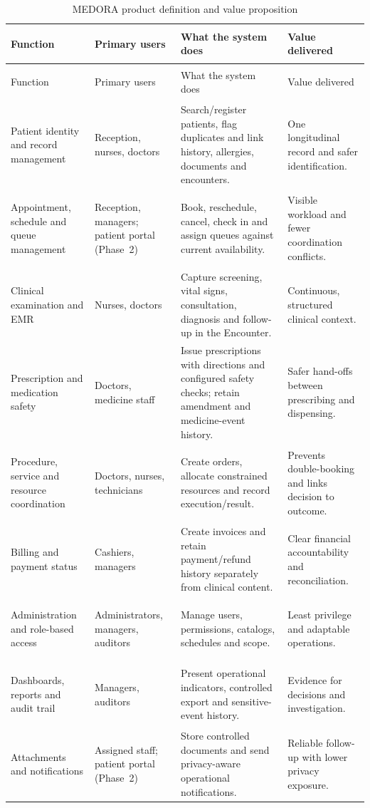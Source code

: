 \documentclass[a4paper,12pt]{article}
\begin{document}
\begingroup
    \renewcommand{\arraystretch}{1.25}
    \small
    \setlength{\LTleft}{0pt}
    \setlength{\LTright}{0pt}
\begin{longtable}{@{}>{\bfseries\raggedright\arraybackslash}p{}p{}p{}p{}@{}}
    \caption{MEDORA product definition and value proposition}\label{tab:product-definition}\\
        \toprule
        Function & Primary users & What the system does & Value delivered \\
        \midrule
    \endfirsthead
    \toprule
    Function & Primary users & What the system does & Value delivered \\
    \midrule
    \endhead
        Patient identity and record management & Reception, nurses, doctors & Search/register patients, flag duplicates and link history, allergies, documents and encounters. & One longitudinal record and safer identification. \\
        Appointment, schedule and queue management & Reception, managers; patient portal (Phase~2) & Book, reschedule, cancel, check in and assign queues against current availability. & Visible workload and fewer coordination conflicts. \\
        Clinical examination and EMR & Nurses, doctors & Capture screening, vital signs, consultation, diagnosis and follow-up in the Encounter. & Continuous, structured clinical context. \\
        Prescription and medication safety & Doctors, medicine staff & Issue prescriptions with directions and configured safety checks; retain amendment and medicine-event history. & Safer hand-offs between prescribing and dispensing. \\
        Procedure, service and resource coordination & Doctors, nurses, technicians & Create orders, allocate constrained resources and record execution/result. & Prevents double-booking and links decision to outcome. \\
        Billing and payment status & Cashiers, managers & Create invoices and retain payment/refund history separately from clinical content. & Clear financial accountability and reconciliation. \\
        Administration and role-based access & Administrators, managers, auditors & Manage users, permissions, catalogs, schedules and scope. & Least privilege and adaptable operations. \\
        Dashboards, reports and audit trail & Managers, auditors & Present operational indicators, controlled export and sensitive-event history. & Evidence for decisions and investigation. \\
        Attachments and notifications & Assigned staff; patient portal (Phase~2) & Store controlled documents and send privacy-aware operational notifications. & Reliable follow-up with lower privacy exposure. \\
        \bottomrule
\end{longtable}
\endgroup
\end{document}
